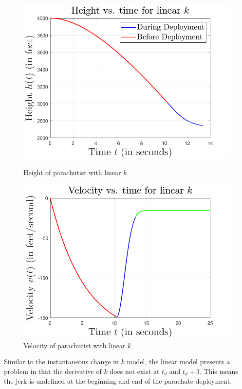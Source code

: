 \documentclass{article}
\begin{document}
    \begin{figure}[H]
        \centering
        \begin{minipage}{0.45\textwidth}
            \centering
            \includegraphics[scale = 0.35]{heighlineark}
            \caption{Height of parachutist with linear $k$}
        \end{minipage}
        \begin{minipage}{0.45\textwidth}
            \centering
            \includegraphics[scale = 0.35]{velocitylineark}
            \caption{Velocity of parachutist with linear $k$}
        \end{minipage}
    \end{figure}
    Similar to the instantaneous change in $k$ model, the linear model presents a problem in that the derivative of $k$ does not exist at $t_d$ and $t_d + 3$. This means the jerk is undefined at the beginning and end of the parachute deployment.
    \newline
\end{document}

